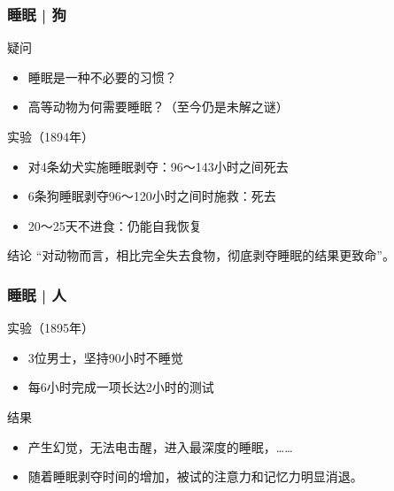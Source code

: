 \begin{frame}
  \frametitle{睡眠 | 狗}
  \begin{block}{疑问}
    \begin{itemize}
      \item 睡眠是一种不必要的习惯？
      \item 高等动物为何需要睡眠？（至今仍是未解之谜）
    \end{itemize}
  \end{block}
  \pause
  \begin{block}{实验（1894年）}
    \begin{itemize}
      \item 对4条幼犬实施睡眠剥夺：96～143小时之间死去
      \item 6条狗睡眠剥夺96～120小时之间时施救：死去
      \item 20～25天不进食：仍能自我恢复
    \end{itemize}
  \end{block}
  \pause
  \begin{block}{结论}
    “对动物而言，相比完全失去食物，彻底剥夺睡眠的结果更致命”。
  \end{block}
\end{frame}

\begin{frame}
  \frametitle{睡眠 | 人}
  \begin{block}{实验（1895年）}
    \begin{itemize}
      \item 3位男士，坚持90小时不睡觉
      \item 每6小时完成一项长达2小时的测试
    \end{itemize}
  \end{block}
  \pause
  \begin{block}{结果}
    \begin{itemize}
      \item 产生幻觉，无法电击醒，进入最深度的睡眠，……
      \item 随着睡眠剥夺时间的增加，被试的注意力和记忆力明显消退。
    \end{itemize}
  \end{block}
\end{frame}

